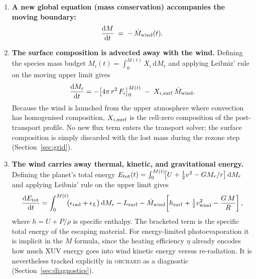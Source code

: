 \documentclass{aastex701}
\newcommand{\dd}{\mathrm{d}}
\newcommand{\Mdot}{\dot{M}}
\newcommand{\orchard}{\textsc{orchard}}
\begin{document}
\begin{enumerate}
  \item \textbf{A new global equation (mass conservation) accompanies
        the moving boundary:}
        \begin{equation}\label{eq:dMdt}
          \frac{\dd M}{\dd t} \;=\; -\,\Mdot_{\rm wind}(t).
        \end{equation}

  \item \textbf{The surface composition is advected away with the
        wind.}  Defining the species mass budget
        $M_{i}(t) = \int_{0}^{M(t)}\!X_{i}\,\dd M_{r}$ and applying
        Leibniz' rule on the moving upper limit gives
        \begin{equation}\label{eq:Xboundary}
          \frac{\dd M_{i}}{\dd t}
            = -\!\left[4\pi\,r^{2}\,F_{i}\right]_{0}^{M(t)}
              \;-\; X_{i,{\rm surf}}\,\Mdot_{\rm wind}.
        \end{equation}
        Because the wind is launched from the upper atmosphere where
        convection has homogenised composition, $X_{i,{\rm surf}}$ is
        the cell-zero composition of the post-transport profile.
        No new flux term enters the transport solver; the surface
        composition is simply discarded with the lost mass during
        the rezone step (Section~\ref{sec:grid}).

  \item \textbf{The wind carries away thermal, kinetic, and
        gravitational energy.}  Defining the planet's total
        energy $E_{\rm tot}(t) = \int_{0}^{M(t)}\!
        \bigl[U + \tfrac{1}{2}v^{2} - GM_{r}/r\bigr]\,\dd M_{r}$ and
        applying Leibniz' rule on the upper limit gives
        \begin{equation}\label{eq:Eledger}
          \frac{\dd E_{\rm tot}}{\dd t}
            = \int_{0}^{M(t)}\!\!
              \bigl(\epsilon_{\rm rad}+\epsilon_{L}\bigr)\,\dd M_{r}
              - L_{\rm surf}
              - \Mdot_{\rm wind}\!
                \left[h_{\rm surf} + \tfrac{1}{2}v_{\rm wind}^{2}
                      - \frac{G\,M}{R}\right],
        \end{equation}
        where $h = U + P/\rho$ is specific enthalpy.  The bracketed
        term is the specific total energy of the escaping material.
        For energy-limited photoevaporation it is implicit in the
        $\Mdot$ formula, since the heating efficiency $\eta$ already
        encodes how much XUV energy goes into wind kinetic energy
        versus re-radiation.  It is nevertheless tracked explicitly in
        \orchard{} as a diagnostic (Section~\ref{sec:diagnostics}).
\end{enumerate}
\end{document}
